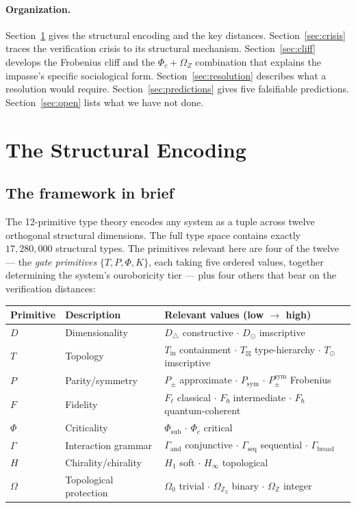 \documentclass[12pt]{article}
\theoremstyle{plain}
\theoremstyle{definition}
\theoremstyle{remark}
\newcommand{\bZ}{\mathbb{Z}}
\begin{document}
\paragraph{Organization.}
Section~\ref{sec:encoding} gives the structural encoding and the key distances.
Section~\ref{sec:crisis} traces the verification crisis to its structural mechanism.
Section~\ref{sec:cliff} develops the Frobenius cliff and the $\Phi_c + \Omega_Z$
combination that explains the impasse's specific sociological form.
Section~\ref{sec:resolution} describes what a resolution would require.
Section~\ref{sec:predictions} gives five falsifiable predictions.
Section~\ref{sec:open} lists what we have not done.

\section{The Structural Encoding}
\label{sec:encoding}

\subsection{The framework in brief}
\label{subsec:framework}

The 12-primitive type theory \cite{synthref} encodes any system as a tuple across twelve
orthogonal structural dimensions. The full type space contains exactly $17{,}280{,}000$
structural types. The primitives relevant here are four of the twelve --- the
\emph{gate primitives} $\{T, P, \Phi, K\}$, each taking five ordered values, together
determining the system's ouroboricity tier --- plus four others that bear on the
verification distances:

\begin{center}
\renewcommand{\arraystretch}{1.3}
\begin{tabular}{@{} l l l @{}}
\toprule
\textbf{Primitive} & \textbf{Description} & \textbf{Relevant values (low $\to$ high)} \\
\midrule
$D$ & Dimensionality & $D_\triangle$ constructive $\cdot$ $D_\odot$ imscriptive \\
$T$ & Topology & $T_\text{in}$ containment $\cdot$ $T_\boxtimes$ type-hierarchy $\cdot$ $T_\odot$ imscriptive \\
$P$ & Parity/symmetry & $P_\pm$ approximate $\cdot$ $P_\text{sym}$ $\cdot$ $P_\pm^\text{sym}$ Frobenius \\
$F$ & Fidelity & $F_\ell$ classical $\cdot$ $F_\eth$ intermediate $\cdot$ $F_\hbar$ quantum-coherent \\
$\Phi$ & Criticality & $\Phi_\text{sub}$ $\cdot$ $\Phi_c$ critical \\
$\Gamma$ & Interaction grammar & $\Gamma_\text{and}$ conjunctive $\cdot$ $\Gamma_\text{seq}$ sequential $\cdot$ $\Gamma_\text{broad}$ \\
$H$ & Chirality/chirality & $H_1$ soft $\cdot$ $H_\infty$ topological \\
$\Omega$ & Topological protection & $\Omega_0$ trivial $\cdot$ $\Omega_{\bZ_2}$ binary $\cdot$ $\Omega_\bZ$ integer \\
\bottomrule
\end{tabular}
\end{center}
\end{document}
